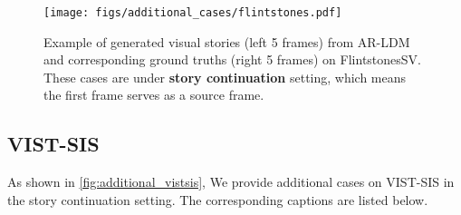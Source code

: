 \documentclass[10pt,twocolumn,letterpaper]{article}
\begin{document}
\begin{figure*}[!th]
\centering
\texttt{[image: figs/additional\_cases/flintstones.pdf]}
\caption{Example of generated visual stories (left 5 frames) from AR-LDM and corresponding ground truths (right 5 frames) on FlintstonesSV. These cases are under \textbf{story continuation} setting, which means the first frame serves as a source frame.}
\label{fig:additional_flintstones}
\end{figure*}
\clearpage

\subsection{VIST-SIS}

As shown in \cref{fig:additional_vistsis}, We provide additional cases on VIST-SIS in the story continuation setting. The corresponding captions are listed below.
\end{document}
